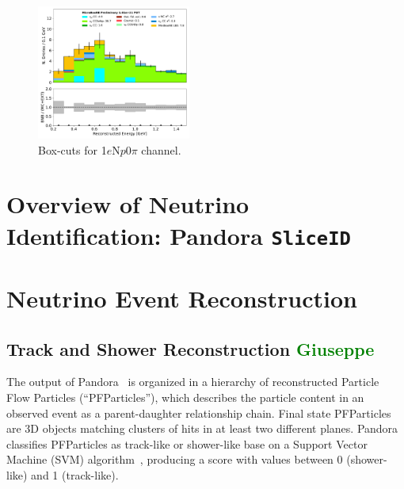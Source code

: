 \documentclass[a4paper]{article}
\newcommand{\npsel}{1$e$N$p$0$\pi$ }
\begin{document}
\begin{figure}[ht]
\begin{center}
\includegraphics[width=0.45\textwidth]{1eNp/reco_e_01162020_box_RUN1.pdf}
\caption{\label{fig:1eNp:box:RUN1}Box-cuts for \npsel channel.}
\end{center}
\end{figure}





\newpage

\section{Overview of Neutrino Identification: Pandora \texttt{SliceID}}
\label{sec:sliceID}




\newpage

\section{Neutrino Event Reconstruction}

\subsection{Track and Shower Reconstruction \textcolor{green}{Giuseppe}}
\label{sec:tkshreco}
The output of Pandora~\cite{bib:pandoraub} is organized in a hierarchy of reconstructed Particle Flow Particles (``PFParticles''), which describes the particle content in an observed event as a parent-daughter relationship chain. Final state PFParticles are 3D objects matching clusters of hits in at least two different planes.
Pandora classifies PFParticles as track-like or shower-like base on a Support Vector Machine (SVM) algorithm~\cite{bib:tkshsvm}, producing a score with values between 0 (shower-like) and 1 (track-like).
\end{document}
